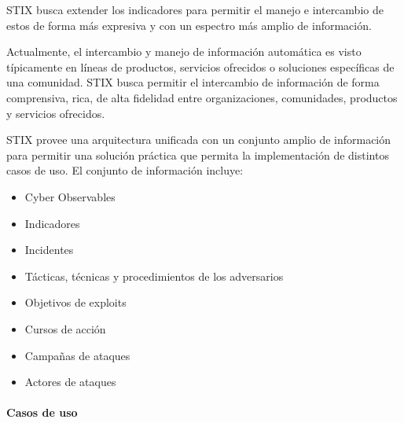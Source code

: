 STIX busca extender los indicadores para permitir el manejo e intercambio de 
estos de forma más expresiva y con un espectro más amplio de información.

Actualmente, el intercambio y manejo de información automática es visto 
típicamente en líneas de productos, servicios ofrecidos o soluciones específicas 
de una comunidad. STIX busca permitir el intercambio de información de forma 
comprensiva, rica, de alta fidelidad entre organizaciones, comunidades, 
productos y servicios ofrecidos.

STIX provee una arquitectura unificada con un conjunto amplio de información 
para permitir una solución práctica que permita la implementación de distintos 
casos de uso. El conjunto de información incluye:
\begin{itemize}
  \item Cyber Observables
  \item Indicadores
  \item Incidentes
  \item Tácticas, técnicas y procedimientos de los adversarios
  \item Objetivos de exploits
  \item Cursos de acción
  \item Campañas de ataques
  \item Actores de ataques
\end{itemize}


\paragraph{Casos de uso}


